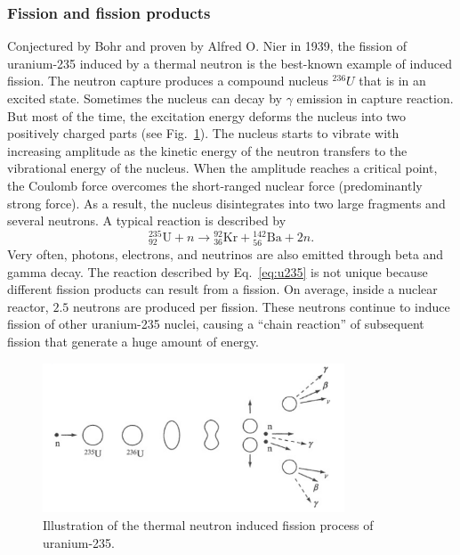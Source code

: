 \documentclass[nofootinbib,preprint,aps]{revtex4-1}
\begin{document}
        \subsubsection{Fission and fission products}
        \label{sec:fission}
        Conjectured by Bohr and proven by Alfred O. Nier in 1939,
        the fission of uranium-235 induced by a thermal neutron
        is the best-known example of induced fission. 
        The neutron capture produces a compound nucleus ${}^{236}U$ that is in an excited state.
        Sometimes the nucleus can decay by $\gamma$ emission in capture reaction.
        But most of the time, the excitation energy deforms the nucleus into two positively charged
        parts (see Fig.~\ref{fig:fission}).
        The nucleus starts to vibrate with increasing amplitude as the kinetic energy of the
        neutron transfers to the vibrational energy of the nucleus.
        When the
        amplitude reaches a critical point, the Coulomb force overcomes the short-ranged nuclear
        force (predominantly strong force). As a result, the nucleus disintegrates into two large fragments and several neutrons.
        A typical reaction is described by
        \begin{equation}
        {}^{235}_{92}\text{U} + n \rightarrow {}^{92}_{36}\text{Kr} + {}^{142}_{56}\text{Ba} + 2 n.
        \label{eq:u235}
        \end{equation}
        Very often, photons, electrons, and neutrinos are also emitted through beta and gamma decay.
        The reaction described by Eq.~\ref{eq:u235} is not unique because different fission products can result
        from a fission.
        On average, inside a nuclear reactor, $2.5$ neutrons are produced per fission. These neutrons
        continue to induce fission of other uranium-235 nuclei, causing a ``chain reaction'' of subsequent
        fission that generate a huge amount of energy.\cite[chapt. 10]{l01}
        \begin{figure}[h]
            \centering
            \includegraphics[width=0.8\textwidth]{fission.png}
            \caption{Illustration of the thermal neutron induced fission process of uranium-235.\cite{l01}}
            \label{fig:fission}
        \end{figure}
\end{document}
